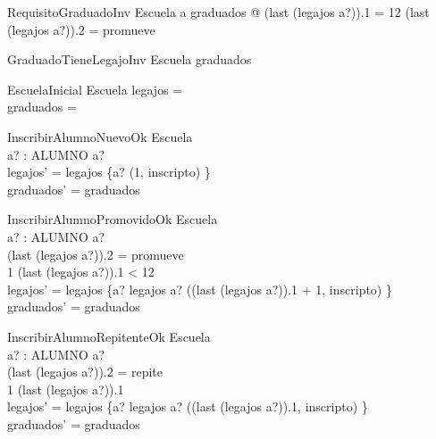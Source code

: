\documentclass{article}
\begin{document}
  \begin{schema}{RequisitoGraduadoInv}
    Escuela
    \where
    \forall a \in graduados @ (last \; (legajos \; a?)).1 = 12 \land (last \; (legajos \; a?)).2 = promueve
  \end{schema}

  \begin{schema}{GraduadoTieneLegajoInv}
    Escuela
    \where
    graduados \subseteq {}
  \end{schema}

  \begin{schema}{EscuelaInicial}
    Escuela
    \where
    legajos = \emptyset \\
    graduados = \emptyset
  \end{schema}

  \begin{schema}{InscribirAlumnoNuevoOk}
    \Delta Escuela \\
    a? : ALUMNO
    \where
    a? \notin {} \\
    legajos' = legajos \cup \{a? \mapsto \langle (1, inscripto) \rangle\} \\
    graduados' = graduados
  \end{schema}

  \begin{schema}{InscribirAlumnoPromovidoOk}
    \Delta Escuela \\
    a? : ALUMNO
    \where
    a? \in {} \\
    (last \; (legajos \; a?)).2 = promueve \\
    1 \leq (last \; (legajos \; a?)).1 < 12 \\ 
    legajos' = legajos \oplus \{a? \mapsto legajos \; a? \cat \langle ((last \; (legajos \; a?)).1 + 1, inscripto) \rangle\} \\
    graduados' = graduados
  \end{schema}

  \begin{schema}{InscribirAlumnoRepitenteOk}
    \Delta Escuela \\
    a? : ALUMNO
    \where
    a? \in {} \\
    (last \; (legajos \; a?)).2 = repite \\
    1 \leq (last \; (legajos \; a?)).1  \\ 
    legajos' = legajos \oplus \{a? \mapsto legajos \; a? \cat \langle ((last \; (legajos \; a?)).1, inscripto) \rangle\} \\
    graduados' = graduados
  \end{schema}
\end{document}
